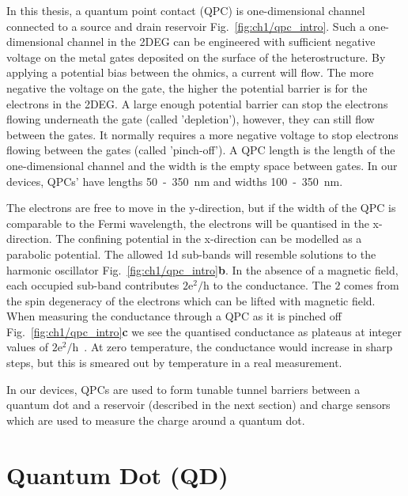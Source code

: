 In this thesis, a quantum point contact (QPC) is one-dimensional channel connected to a source and drain reservoir Fig.~\ref{fig:ch1/qpc_intro}. Such a one-dimensional channel in the 2DEG can be engineered with sufficient negative voltage on the metal gates deposited on the surface of the heterostructure. By applying a potential bias between the ohmics, a current will flow. The more negative the voltage on the gate, the higher the potential barrier is for the electrons in the 2DEG. A large enough potential barrier can stop the electrons flowing underneath the gate (called 'depletion'), however, they can still flow between the gates. It normally requires a more negative voltage to stop electrons flowing between the gates (called 'pinch-off'). A QPC length is the length of the one-dimensional channel and the width is the empty space between gates. In our devices, QPCs' have lengths 50~-~\qty{350}{nm} and widths 100~-~\qty{350}{nm}.

The electrons are free to move in the y-direction, but if the width of the QPC is comparable to the Fermi wavelength, the electrons will be quantised in the x-direction. The confining potential in the x-direction can be modelled as a parabolic potential. The allowed 1d sub-bands will resemble solutions to the harmonic oscillator Fig.~\ref{fig:ch1/qpc_intro}\textbf{b}. In the absence of a magnetic field, each occupied sub-band contributes $\mathrm{2e^2/h}$ to the conductance. The $2$ comes from the spin degeneracy of the electrons which can be lifted with magnetic field. When measuring the conductance through a QPC as it is pinched off Fig.~\ref{fig:ch1/qpc_intro}\textbf{c} we see the quantised conductance as plateaus at integer values of $\mathrm{2e^2/h}$~\cite{qpc_first_measurement}. At zero temperature, the conductance would increase in sharp steps, but this is smeared out by temperature in a real measurement.

In our devices, QPCs are used to form tunable tunnel barriers between a quantum dot and a reservoir (described in the next section) and charge sensors~\cite{cs_first_measurement} which are used to measure the charge around a quantum dot. 




\afterpage{\clearpage}
\section{Quantum Dot (QD)}

